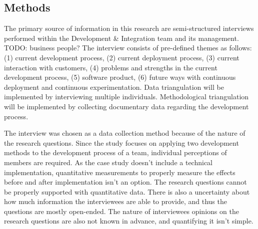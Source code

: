 \documentclass[english]{tktltiki2}
\theoremstyle{definition}
\theoremstyle{remark}
\begin{document}

\subsection{Methods} %
The primary source of information in this research are semi-structured interviews performed within the Development & Integration team and its management. TODO: business people? The interview consists of pre-defined themes as follows: (1) current development process, (2) current deployment process, (3) current interaction with customers, (4) problems and strengths in the current development process, (5) software product, (6) future ways with continuous deployment and continuous experimentation. Data triangulation will be implemented by interviewing multiple individuals. Methodological triangulation will be implemented by collecting documentary data regarding the development process. 	

The interview was chosen as a data collection method because of the nature of the research questions. Since the study focuses on applying two development methods to the development process of a team, individual perceptions of members are required. As the case study doesn't include a technical implementation, quantitative measurements to properly measure the effects before and after implementation isn't an option. The research questions cannot be properly supported with quantitative data. There is also a uncertainty about how much information the interviewees are able to provide, and thus the questions are mostly open-ended. The nature of interviewees opinions on the research questions are also not known in advance, and quantifying it isn't simple. 
\end{document}
